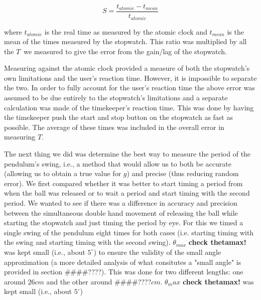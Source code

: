 \documentclass[iop,numberedappendix,appendixfloats]{emulateapj}
\def\g{$g$}
\def\T{$T$}
\def\fillin{\#\#\#\#????}
\def\deg{^{\circ}}
\begin{document}
\begin{equation}
\label{eq:S}
S=\frac{t_{atomic}-t_{mean}}{t_{atomic}} 
\end{equation}

where $t_{atomic}$ is the real time as measured by the 
atomic clock 
and $t_{mean}$ is the mean of the times measured by the 
stopwatch.  This ratio was multiplied by all the \T\ we measured to give
the error from the gain/lag of the stopwatch.

Measuring against the atomic clock provided a measure of both the stopwatch's 
own limitations and the user's reaction time.  However, it is impossible to 
separate the two.  In order to fully account for the user's reaction time the 
above error was assumed to be due entirely to the stopwatch's limitations and 
a separate calculation was made of the timekeeper's reaction time.  This was 
done by having the timekeeper push the start and stop button on the 
stopwatch as fast as possible.  The average of these times was included in 
the overall error in measuring \T.

The next thing we did was determine the best way to measure the period of the 
pendulum's swing, i.e., a method that would allow us to both be accurate 
(allowing us to obtain a true value for \g) and precise (thus reducing random 
error). We first compared whether it was better to start timing a period from 
when the ball was released or to wait a period and start timing with the 
second period.  We wanted to see if there was a difference in accuracy and 
precision between the simultaneous double hand movement of releasing the ball 
while starting the stopwatch and just timing the period by eye. For this we 
timed a single swing of the pendulum eight times for both cases (i.e. starting 
timing with the swing and starting timing with the second swing). $\theta_{max}$ 
{\bf check thetamax!} was kept small (i.e., about $5\deg$) to ensure the 
validity of the small angle approximation (a more detailed analysis of what 
consitutes a "small angle" is provided in section \fillin). This was done 
for two different lengths: one around $26cm$ and the other around \fillin$cm$. 
$\theta_max$ {\bf check thetamax!} was kept small (i.e., about $5\deg$) 
\end{document}
